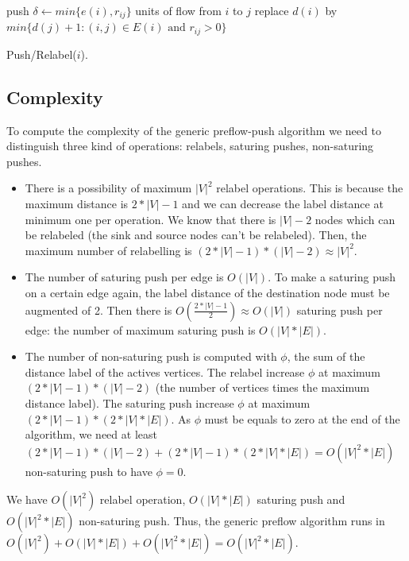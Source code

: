 \begin{algorithm}
  {push $\delta\gets min\{e(i), r_{ij}\}$ units of flow from $i$ to $j$\;}
\Else
   {replace $d(i)$ by $min\{d(j)+1 : (i, j) \in E(i) \text{ and } r_{ij} > 0 \}$\;}
\caption{Push/Relabel($i$).}
\end{algorithm}

\subsection{Complexity}

To compute the complexity of the generic preflow-push algorithm we need to distinguish three kind of operations: relabels, saturing pushes, non-saturing pushes.
\begin{itemize}
\item There is a possibility of maximum $|V|^2$ relabel operations. This is because the maximum distance is $2*|V| - 1$ and we can decrease the label distance at minimum one per operation. We know that there is $|V| - 2$ nodes which can be relabeled (the sink and source nodes can't be relabeled). Then, the maximum number of relabelling is $(2*|V| - 1) * (|V| - 2) \approx |V|^2$.

\item The number of saturing push per edge is $O(|V|)$. To make a saturing push on a certain edge again, the label distance of the destination node must be augmented of 2. Then there is $O(\frac{2*|V| - 1}{2}) \approx O(|V|)$ saturing push per edge: the number of maximum saturing push is $O(|V|*|E|)$.

\item The number of non-saturing push is computed with $\phi$, the sum of the distance label of the actives vertices. The relabel increase $\phi$ at maximum $(2*|V| - 1)*(|V|-2)$ (the number of vertices times the maximum distance label). The saturing push increase $\phi$ at maximum $(2*|V|-1)*(2*|V|*|E|)$. As $\phi$ must be equals to zero at the end of the algorithm, we need at least $(2*|V|-1)*(|V|-2) + (2*|V|-1)*(2*|V|*|E|) = O(|V|^2*|E|)$ non-saturing push to have $\phi = 0$.
\end{itemize}
We have $O(|V|^2)$ relabel operation, $O(|V|*|E|)$ saturing push and $O(|V|^2*|E|)$ non-saturing push. Thus, the generic preflow algorithm runs in $O(|V|^2) + O(|V|*|E|) + O(|V|^2*|E|) = O(|V|^2 *|E|)$. %
